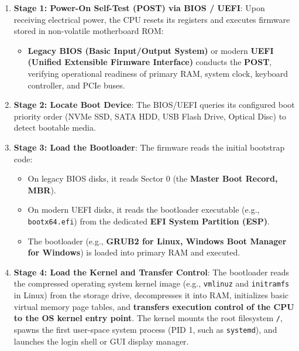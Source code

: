 \begin{enumerate}[leftmargin=1.5em]
    \item \textbf{Stage 1: Power-On Self-Test (POST) via BIOS / UEFI}:
    Upon receiving electrical power, the CPU resets its registers and executes firmware stored in non-volatile motherboard ROM:
    \begin{itemize}
        \item \textbf{Legacy BIOS (Basic Input/Output System)} or modern \textbf{UEFI (Unified Extensible Firmware Interface)} conducts the \textbf{POST}, verifying operational readiness of primary RAM, system clock, keyboard controller, and PCIe buses.
    \end{itemize}

    \item \textbf{Stage 2: Locate Boot Device}:
    The BIOS/UEFI queries its configured boot priority order (NVMe SSD, SATA HDD, USB Flash Drive, Optical Disc) to detect bootable media.

    \item \textbf{Stage 3: Load the Bootloader}:
    The firmware reads the initial bootstrap code:
    \begin{itemize}
        \item On legacy BIOS disks, it reads Sector 0 (the \textbf{Master Boot Record, MBR}).
        \item On modern UEFI disks, it reads the bootloader executable (e.g., \texttt{bootx64.efi}) from the dedicated \textbf{EFI System Partition (ESP)}.
        \item The bootloader (e.g., \textbf{GRUB2 for Linux, Windows Boot Manager for Windows}) is loaded into primary RAM and executed.
    \end{itemize}

    \item \textbf{Stage 4: Load the Kernel and Transfer Control}:
    The bootloader reads the compressed operating system kernel image (e.g., \texttt{vmlinuz} and \texttt{initramfs} in Linux) from the storage drive, decompresses it into RAM, initializes basic virtual memory page tables, and \textbf{transfers execution control of the CPU to the OS kernel entry point}. The kernel mounts the root filesystem \texttt{/}, spawns the first user-space system process (PID 1, such as \texttt{systemd}), and launches the login shell or GUI display manager.
\end{enumerate}

